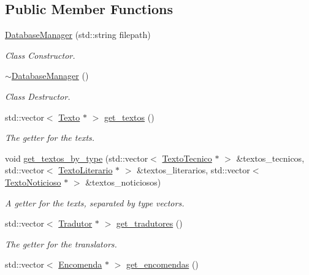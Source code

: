 \subsection*{Public Member Functions}
\begin{DoxyCompactItemize}
\item 
\hyperlink{class_database_manager_a24e3c3701ce01fdac96cc170b334aeba}{Database\-Manager} (std\-::string filepath)
\begin{DoxyCompactList}\small\item\em Class Constructor. \end{DoxyCompactList}\item 
\hyperlink{class_database_manager_ae9b3a5da1e04fbb00faf8a034da1d063}{$\sim$\-Database\-Manager} ()
\begin{DoxyCompactList}\small\item\em Class Destructor. \end{DoxyCompactList}\item 
std\-::vector$<$ \hyperlink{class_texto}{Texto} $\ast$ $>$ \hyperlink{class_database_manager_a362dc9fb3beb6cd0ca9cb1d42703ec03}{get\-\_\-textos} ()
\begin{DoxyCompactList}\small\item\em The getter for the texts. \end{DoxyCompactList}\item 
void \hyperlink{class_database_manager_a3ea3390feb2069715c7af51ebb41a26c}{get\-\_\-textos\-\_\-by\-\_\-type} (std\-::vector$<$ \hyperlink{class_texto_tecnico}{Texto\-Tecnico} $\ast$ $>$ \&textos\-\_\-tecnicos, std\-::vector$<$ \hyperlink{class_texto_literario}{Texto\-Literario} $\ast$ $>$ \&textos\-\_\-literarios, std\-::vector$<$ \hyperlink{class_texto_noticioso}{Texto\-Noticioso} $\ast$ $>$ \&textos\-\_\-noticiosos)
\begin{DoxyCompactList}\small\item\em A getter for the texts, separated by type vectors. \end{DoxyCompactList}\item 
std\-::vector$<$ \hyperlink{class_tradutor}{Tradutor} $\ast$ $>$ \hyperlink{class_database_manager_ad0f509067821ad15a9b25d86d2b515a4}{get\-\_\-tradutores} ()
\begin{DoxyCompactList}\small\item\em The getter for the translators. \end{DoxyCompactList}\item 
std\-::vector$<$ \hyperlink{class_encomenda}{Encomenda} $\ast$ $>$ \hyperlink{class_database_manager_a5c2b2ad77ee83de5b1fb2f07cdfc6736}{get\-\_\-encomendas} ()

\end{DoxyCompactItemize}
